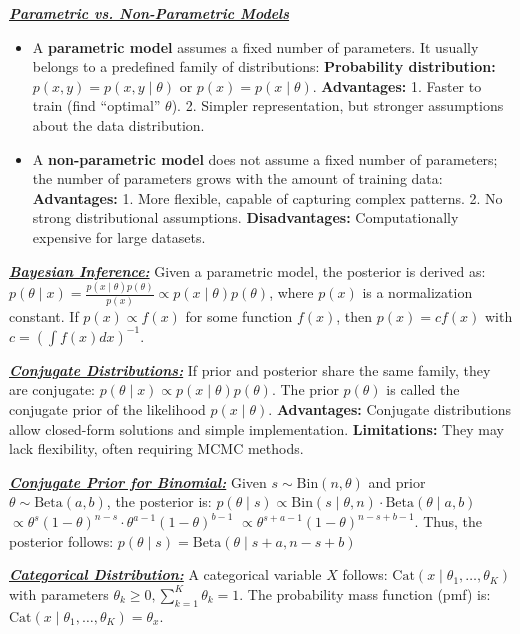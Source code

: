 \documentclass[10pt]{article}
\newcommand{\bulletPoint}[1]{\ul{\textit{\textbf{#1}}}}
\begin{document}
\begin{multicols*}{2}
\begin{itemize}[label=$\cdot$,leftmargin=0pt]
\end{itemize}
\bulletPoint{Parametric vs. Non-Parametric Models}
\begin{itemize}[leftmargin=0pt]
\item A \textbf{parametric model} assumes a fixed number of parameters. It usually belongs to a predefined family of distributions:
\textbf{Probability distribution:} \( p(x,y) = p(x,y \mid \theta) \) or \( p(x) = p(x \mid \theta) \). \textbf{Advantages:} 1. Faster to train (find “optimal” \( \theta \)). 2. Simpler representation, but stronger assumptions about the data distribution.
\item A \textbf{non-parametric model} does not assume a fixed number of parameters; the number of parameters grows with the amount of training data:
\textbf{Advantages:}
  1. More flexible, capable of capturing complex patterns.
  2. No strong distributional assumptions.
\textbf{Disadvantages:}
  Computationally expensive for large datasets.
\end{itemize}

\bulletPoint{Bayesian Inference:} \quad
Given a parametric model, the posterior is derived as: $p(\theta \mid x) = \frac{p(x \mid \theta) p(\theta)}{p(x)} \propto p(x \mid \theta) p(\theta)$,
where $p(x)$ is a normalization constant.
If $p(x) \propto f(x)$ for some function $f(x)$, then $p(x) = c f(x)$ with 
$c = \left( \int f(x) dx \right)^{-1}$.

\bulletPoint{Conjugate Distributions:} \quad
If prior and posterior share the same family, they are conjugate:
$p(\theta \mid x) \propto p(x \mid \theta) p(\theta)$.
The prior $p(\theta)$ is called the conjugate prior of the likelihood $p(x \mid \theta)$.
\textbf{Advantages:} Conjugate distributions allow closed-form solutions and simple implementation.
\textbf{Limitations:} They may lack flexibility, often requiring MCMC methods.


\bulletPoint{Conjugate Prior for Binomial:} \quad
Given $s \sim \text{Bin}(n, \theta)$ and prior $\theta \sim \text{Beta}(a, b)$, the posterior is:
$p(\theta \mid s) \propto \text{Bin}(s \mid \theta, n) \cdot \text{Beta}(\theta \mid a, b)$
$\propto \theta^s (1 - \theta)^{n-s} \cdot \theta^{a-1} (1 - \theta)^{b-1}$
$\propto \theta^{s+a-1} (1 - \theta)^{n-s+b-1}$. 
Thus, the posterior follows:
$p(\theta \mid s) = \text{Beta}(\theta \mid s + a, n - s + b)$


\bulletPoint{Categorical Distribution:} \quad
A categorical variable $X$ follows:
$\text{Cat} (x \mid \theta_1, \dots, \theta_K)$ with parameters $\theta_k \geq 0, \sum_{k=1}^{K} \theta_k = 1$. 
The probability mass function (pmf) is:
$\text{Cat} (x \mid \theta_1, \dots, \theta_K) = \theta_x$.


\end{multicols*}
\end{document}
